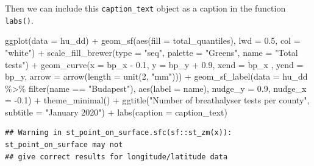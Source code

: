 \documentclass[
]{book}
\newenvironment{Shaded}{\begin{snugshade}}{\end{snugshade}}
\newcommand{\AttributeTok}[1]{\textcolor[rgb]{0.77,0.63,0.00}{#1}}
\newcommand{\DecValTok}[1]{\textcolor[rgb]{0.00,0.00,0.81}{#1}}
\newcommand{\FloatTok}[1]{\textcolor[rgb]{0.00,0.00,0.81}{#1}}
\newcommand{\FunctionTok}[1]{\textcolor[rgb]{0.00,0.00,0.00}{#1}}
\newcommand{\NormalTok}[1]{#1}
\newcommand{\SpecialCharTok}[1]{\textcolor[rgb]{0.00,0.00,0.00}{#1}}
\newcommand{\StringTok}[1]{\textcolor[rgb]{0.31,0.60,0.02}{#1}}
\begin{document}
Then we can include this \texttt{caption\_text} object as a caption in the function \texttt{labs()}.

\begin{Shaded}
\begin{Highlighting}[]
\FunctionTok{ggplot}\NormalTok{(}\AttributeTok{data =}\NormalTok{ hu\_dd) }\SpecialCharTok{+} 
  \FunctionTok{geom\_sf}\NormalTok{(}\FunctionTok{aes}\NormalTok{(}\AttributeTok{fill =}\NormalTok{ total\_quantiles), }\AttributeTok{lwd =} \FloatTok{0.5}\NormalTok{, }\AttributeTok{col =} \StringTok{"white"}\NormalTok{) }\SpecialCharTok{+} 
  \FunctionTok{scale\_fill\_brewer}\NormalTok{(}\AttributeTok{type =} \StringTok{"seq"}\NormalTok{, }\AttributeTok{palette =} \StringTok{"Greens"}\NormalTok{, }\AttributeTok{name =} \StringTok{"Total tests"}\NormalTok{) }\SpecialCharTok{+} 
  \FunctionTok{geom\_curve}\NormalTok{(}\AttributeTok{x =}\NormalTok{ bp\_x }\SpecialCharTok{{-}} \FloatTok{0.1}\NormalTok{, }
             \AttributeTok{y =}\NormalTok{ bp\_y }\SpecialCharTok{+} \FloatTok{0.9}\NormalTok{, }
             \AttributeTok{xend =}\NormalTok{ bp\_x , }
             \AttributeTok{yend =}\NormalTok{ bp\_y, }
             \AttributeTok{arrow =} \FunctionTok{arrow}\NormalTok{(}\AttributeTok{length =} \FunctionTok{unit}\NormalTok{(}\DecValTok{2}\NormalTok{, }\StringTok{"mm"}\NormalTok{))) }\SpecialCharTok{+}
  \FunctionTok{geom\_sf\_label}\NormalTok{(}\AttributeTok{data =}\NormalTok{ hu\_dd }\SpecialCharTok{\%\textgreater{}\%} \FunctionTok{filter}\NormalTok{(name }\SpecialCharTok{==} \StringTok{"Budapest"}\NormalTok{), }
                \FunctionTok{aes}\NormalTok{(}\AttributeTok{label =}\NormalTok{ name), }
                \AttributeTok{nudge\_y =} \FloatTok{0.9}\NormalTok{, }
                \AttributeTok{nudge\_x =} \SpecialCharTok{{-}}\FloatTok{0.1}\NormalTok{) }\SpecialCharTok{+} 
  \FunctionTok{theme\_minimal}\NormalTok{() }\SpecialCharTok{+} 
  \FunctionTok{ggtitle}\NormalTok{(}\StringTok{"Number of breathalyser tests per county"}\NormalTok{, }\AttributeTok{subtitle =} \StringTok{"January 2020"}\NormalTok{) }\SpecialCharTok{+} 
  \FunctionTok{labs}\NormalTok{(}\AttributeTok{caption =}\NormalTok{ caption\_text)}
\end{Highlighting}
\end{Shaded}

\begin{verbatim}
## Warning in st_point_on_surface.sfc(sf::st_zm(x)): st_point_on_surface may not
## give correct results for longitude/latitude data
\end{verbatim}
\end{document}
